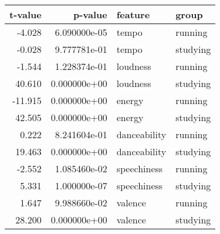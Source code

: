 \begin{tabular}{rrll}
\toprule
 t-value &      p-value &      feature &    group \\
\midrule
  -4.028 & 6.090000e-05 &        tempo &  running \\
  -0.028 & 9.777781e-01 &        tempo & studying \\
  -1.544 & 1.228374e-01 &     loudness &  running \\
  40.610 & 0.000000e+00 &     loudness & studying \\
 -11.915 & 0.000000e+00 &       energy &  running \\
  42.505 & 0.000000e+00 &       energy & studying \\
   0.222 & 8.241604e-01 & danceability &  running \\
  19.463 & 0.000000e+00 & danceability & studying \\
  -2.552 & 1.085460e-02 &  speechiness &  running \\
   5.331 & 1.000000e-07 &  speechiness & studying \\
   1.647 & 9.988660e-02 &      valence &  running \\
  28.200 & 0.000000e+00 &      valence & studying \\
\bottomrule
\end{tabular}
